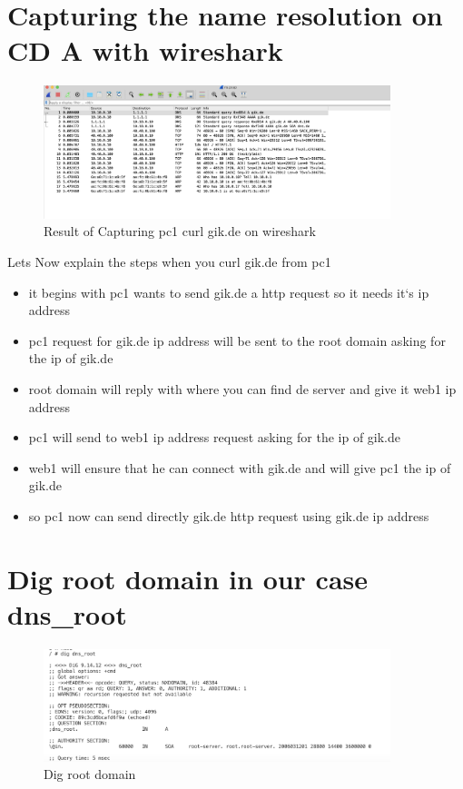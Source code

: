 \section{Capturing the name resolution on CD A  with wireshark}

\begin{figure}[H]
\centering
  \includegraphics[width=0.9\textwidth]{Images/curlWire.png}
  \caption{Result of Capturing pc1 curl gik.de on wireshark}
  \label{fig:2.7}
\end{figure}

Lets Now explain the steps when you curl gik.de from pc1
\begin{itemize}
\item it begins with pc1 wants to send gik.de a http request so it needs it`s ip address
\item pc1 request for gik.de ip address will be sent to the root domain asking for the ip of gik.de
  \item root domain will reply with where you can find de server and give it web1 ip address
  \item pc1 will send to web1 ip address request asking for the ip of gik.de
  \item web1 will ensure that he can connect with gik.de and will give pc1 the ip of gik.de 
  \item so pc1 now can send directly gik.de http request using gik.de ip address

\end{itemize}

\section{Dig root domain in our case dns\_root}
\begin{figure}[H]
\centering
  \includegraphics[width=0.9\textwidth]{Images/DigRootDomain.png}
  \caption{Dig root domain}
  \label{fig:2.8}
\end{figure}


